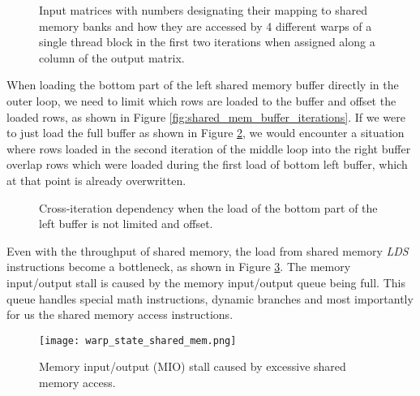 \begin{figure}[ht]
	\centering
	\def\svgwidth{0.7\textwidth}
	\fontsize{8}{10}\selectfont
	
	\caption{Input matrices with numbers designating their mapping to shared memory banks and how they are accessed by 4 different warps of a single thread block in the first two iterations when assigned along a column of the output matrix.}
	\label{fig:warp_per_shift_shared_mem_shifts}
\end{figure}

When loading the bottom part of the left shared memory buffer directly in the outer loop, we need to limit which rows are loaded to the buffer and offset the loaded rows, as shown in Figure \ref{fig:shared_mem_buffer_iterations}. If we were to just load the full buffer as shown in Figure \ref{fig:left_buffer_no_preload}, we would encounter a situation where rows loaded in the second iteration of the middle loop into the right buffer overlap rows which were loaded during the first load of bottom left buffer, which at that point is already overwritten.  


\begin{figure}[ht]
	\centering
	\def\svgwidth{0.4\textwidth}
	\fontsize{8}{10}\selectfont
	
	\caption{Cross-iteration dependency when the load of the bottom part of the left buffer is not limited and offset.}
	\label{fig:left_buffer_no_preload}
\end{figure}

Even with the throughput of shared memory, the load from shared memory \textit{LDS} instructions become a bottleneck, as shown in Figure \ref{fig:warp_state_shared_mem}. The memory input/output stall is caused by the memory input/output queue being full. This queue handles special math instructions, dynamic branches and most importantly for us the shared memory access instructions.

\begin{figure}[ht]
	\centering
	\texttt{[image: warp\_state\_shared\_mem.png]}
	\caption{Memory input/output (MIO) stall caused by excessive shared memory access.}
	\label{fig:warp_state_shared_mem}
\end{figure}

